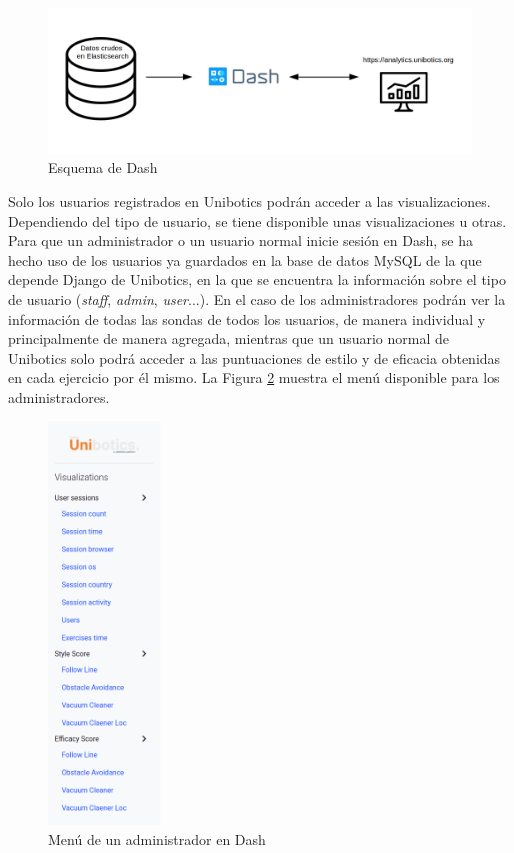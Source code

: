 \begin{figure}[H]
    \centering
    \includegraphics[width=17cm, keepaspectratio]{img/esquemadash.png}
    \caption{Esquema de Dash}
    \label{fig:menu}
\end{figure}


Solo los usuarios registrados en Unibotics podrán acceder a las visualizaciones. Dependiendo del tipo de usuario, se tiene disponible unas visualizaciones u otras. Para que un administrador o un usuario normal inicie sesión en Dash, se ha hecho uso de los usuarios ya guardados en la base de datos MySQL de la que depende Django de Unibotics, en la que se encuentra la información sobre el tipo de usuario (\textit{staff}, \textit{admin}, \textit{user}...). En el caso de los administradores podrán ver la información de todas las sondas de todos los usuarios, de manera individual y principalmente de manera agregada, mientras que un usuario normal de Unibotics solo podrá acceder a las puntuaciones de estilo y de eficacia obtenidas en cada ejercicio por él mismo. La Figura \ref{fig:menu} muestra el menú disponible para los administradores.

\begin{figure}[H]
    \centering
    \includegraphics[width=3cm, keepaspectratio]{img/menu.png}
    \caption{Menú de un administrador en Dash}
    \label{fig:menu}
\end{figure}


